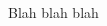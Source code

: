 \chapter*{\prefacename}\label{ch:preface}

Blah blah blah

\begin{multicols}{2}
  \centering
  \signature{\authorA}{\emailA}
  \vspace{3\baselineskip}
  \signature{\authorB}{\emailB}
  \vspace{3\baselineskip}
  \signature{\authorC}{\emailC}
  \vspace{3\baselineskip}
  \signature{\authorD}{\emailD}
  \columnbreak
  \signature{\authorE}{\emailE}
  \vspace{3\baselineskip}
  \signature{\authorF}{\emailF}
  \vspace{3\baselineskip}
  \signature{\authorG}{\emailG}
  \vspace{3\baselineskip}
  \signature{\authorH}{\emailH}
\end{multicols}
